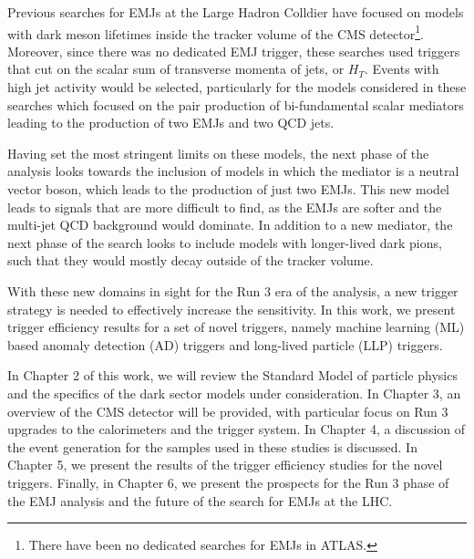Previous searches for EMJs at the Large Hadron Colldier have focused on models with dark meson lifetimes inside the tracker volume of the CMS detector\footnote{There have been no dedicated searches for EMJs in ATLAS.}. Moreover, since there was no dedicated EMJ trigger, these searches used triggers that cut on the scalar sum of transverse momenta of jets, or $H_T$. Events with high jet activity would be selected, particularly for the models considered in these searches which focused on the pair production of bi-fundamental scalar mediators leading to the production of two EMJs and two QCD jets.

Having set the most stringent limits on these models, the next phase of the analysis looks towards the inclusion of models in which the mediator is a neutral vector boson, which leads to the production of just two EMJs. This new model leads to signals that are more difficult to find, as the EMJs are softer and the multi-jet QCD background would dominate. In addition to a new mediator, the next phase of the search looks to include models with longer-lived dark pions, such that they would mostly decay outside of the tracker volume.

With these new domains in sight for the Run 3 era of the analysis, a new trigger strategy is needed to effectively increase the sensitivity. In this work, we present trigger efficiency results for a set of novel triggers, namely machine learning (ML) based anomaly detection (AD) triggers and long-lived particle (LLP) triggers.

In Chapter 2 of this work, we will review the Standard Model of particle physics and the specifics of the dark sector models under consideration. In Chapter 3, an overview of the CMS detector will be provided, with particular focus on Run 3 upgrades to the calorimeters and the trigger system. In Chapter 4, a discussion of the event generation for the samples used in these studies is discussed. In Chapter 5, we present the results of the trigger efficiency studies for the novel triggers. Finally, in Chapter 6, we present the prospects for the Run 3 phase of the EMJ analysis and the future of the search for EMJs at the LHC.



